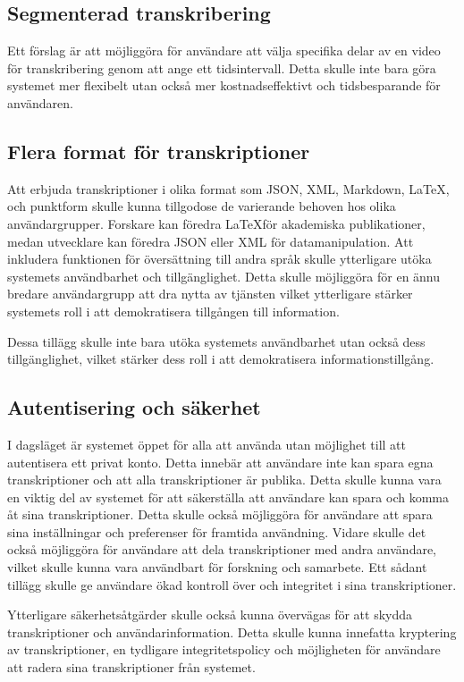 \subsection{Segmenterad transkribering}
Ett förslag är att möjliggöra för användare att
välja specifika delar av en video för transkribering genom att ange ett
tidsintervall. Detta skulle inte bara göra systemet mer flexibelt utan också
mer kostnadseffektivt och tidsbesparande för användaren.

\subsection{Flera format för transkriptioner}
Att erbjuda transkriptioner i olika format
som JSON, XML, Markdown, \LaTeX, och punktform skulle kunna tillgodose de
varierande behoven hos olika användargrupper. Forskare kan föredra \LaTeX för
akademiska publikationer, medan utvecklare kan föredra JSON eller XML för
datamanipulation. Att inkludera funktionen för översättning till andra språk skulle ytterligare utöka systemets användbarhet och tillgänglighet. Detta skulle möjliggöra för en ännu bredare användargrupp att dra nytta av tjänsten vilket ytterligare stärker systemets roll i att demokratisera tillgången till information.

Dessa tillägg skulle inte bara utöka systemets användbarhet utan också dess
tillgänglighet, vilket stärker dess roll i att demokratisera
informationstillgång.

\subsection{Autentisering och säkerhet}
I dagsläget är systemet öppet för alla att använda utan möjlighet till
att autentisera ett privat konto. Detta innebär att användare inte kan spara
egna transkriptioner och att alla transkriptioner är publika. Detta skulle
kunna vara en viktig del av systemet för att säkerställa att användare kan
spara och komma åt sina transkriptioner. Detta skulle också möjliggöra för
användare att spara sina inställningar och preferenser för framtida användning.
Vidare skulle det också möjliggöra för användare att dela transkriptioner med
andra användare, vilket skulle kunna vara användbart för forskning och
samarbete. Ett sådant tillägg skulle ge användare ökad kontroll över och
integritet i sina transkriptioner.

Ytterligare säkerhetsåtgärder skulle också kunna övervägas för att skydda
transkriptioner och användarinformation. Detta skulle kunna innefatta
kryptering av transkriptioner, en tydligare integritetspolicy och möjligheten
för användare att radera sina transkriptioner från systemet.

